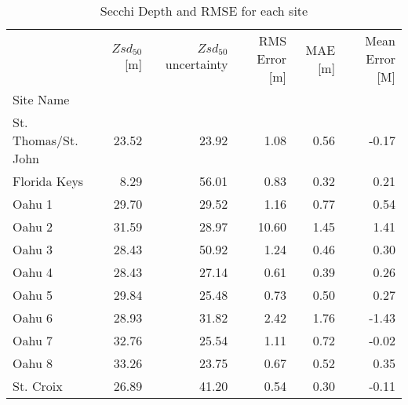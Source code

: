 \begin{table}
\centering
\caption{Secchi Depth and RMSE for each site}
\label{tab:ocean_color_summary_by_site}
\begin{tabular}{lrrrrr}
\toprule
{} &  $Zsd_{50}$[m] &  $Zsd_{50}$ uncertainty &  RMS Error [m] &  MAE [m] &  Mean Error [M] \\
Site Name           &                &                         &                &          &                 \\
\midrule
St. Thomas/St. John &          23.52 &                   23.92 &           1.08 &     0.56 &           -0.17 \\
Florida Keys        &           8.29 &                   56.01 &           0.83 &     0.32 &            0.21 \\
Oahu 1              &          29.70 &                   29.52 &           1.16 &     0.77 &            0.54 \\
Oahu 2              &          31.59 &                   28.97 &          10.60 &     1.45 &            1.41 \\
Oahu 3              &          28.43 &                   50.92 &           1.24 &     0.46 &            0.30 \\
Oahu 4              &          28.43 &                   27.14 &           0.61 &     0.39 &            0.26 \\
Oahu 5              &          29.84 &                   25.48 &           0.73 &     0.50 &            0.27 \\
Oahu 6              &          28.93 &                   31.82 &           2.42 &     1.76 &           -1.43 \\
Oahu 7              &          32.76 &                   25.54 &           1.11 &     0.72 &           -0.02 \\
Oahu 8              &          33.26 &                   23.75 &           0.67 &     0.52 &            0.35 \\
St. Croix           &          26.89 &                   41.20 &           0.54 &     0.30 &           -0.11 \\
\bottomrule
\end{tabular}
\end{table}
